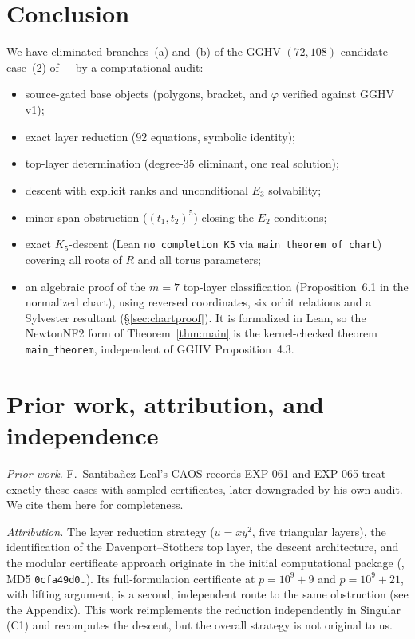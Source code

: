 \documentclass[a4paper,11pt]{article}
\newcommand{\filename}[1]{\texttt{\seqsplit{#1}}}
\theoremstyle{plain}
\theoremstyle{definition}
\theoremstyle{remark}
\begin{document}
\section{Conclusion}\label{sec:conclusion}

We have eliminated branches~(a) and~(b) of the GGHV $(72,108)$ candidate---case~(2) of~\cite[Proposition~4.3]{GGHV}---by a computational audit:
\begin{itemize}[nosep]
\item source-gated base objects (polygons, bracket, and $\varphi$ verified against GGHV v1);
\item exact layer reduction ($92$ equations, symbolic identity);
\item top-layer determination (degree-$35$ eliminant, one real solution);
\item descent with explicit ranks and unconditional $E_3$ solvability;
\item minor-span obstruction ($(t_1,t_2)^5$) closing the $E_2$ conditions;
\item exact $K_5$-descent (Lean \texttt{no\_completion\_K5} via \texttt{main\_theorem\_of\_chart}) covering all roots of $R$ and all torus parameters;
\item an algebraic proof of the $m=7$ top-layer classification (Proposition~6.1 in the normalized chart), using reversed coordinates, six orbit relations and a Sylvester resultant (\S\ref{sec:chartproof}). It is formalized in Lean, so the NewtonNF2 form of Theorem~\ref{thm:main} is the kernel-checked theorem \texttt{main\_theorem}, independent of GGHV Proposition~4.3.
\end{itemize}

\section{Prior work, attribution, and independence}\label{sec:attribution}

\emph{Prior work.} F.~Santiba\~nez-Leal's CAOS records EXP-061 and EXP-065 treat exactly these cases with sampled certificates, later downgraded by his own audit. We cite them here for completeness.

\emph{Attribution.} The layer reduction strategy ($u=xy^2$, five triangular layers), the identification of the Davenport--Stothers top layer, the descent architecture, and the modular certificate approach originate in the initial computational package (\filename{branch\_ab\_elimination.zip}, MD5 \texttt{0cfa49d0\dots}). Its full-formulation certificate at $p=10^9+9$ and $p=10^9+21$, with lifting argument, is a second, independent route to the same obstruction (see the Appendix). This work reimplements the reduction independently in {\sc Singular} (C1) and recomputes the descent, but the overall strategy is not original to us.
\end{document}
